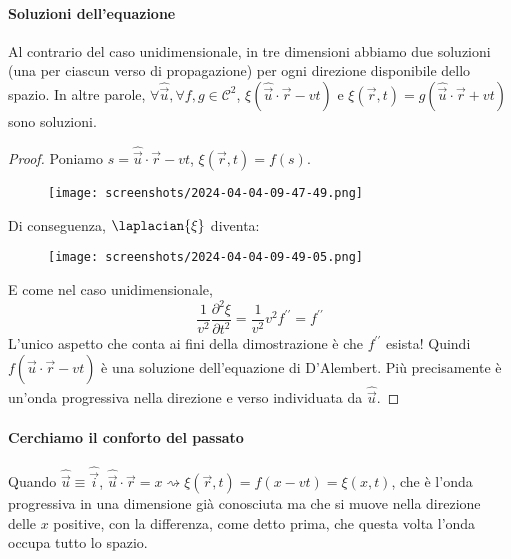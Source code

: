 \paragraph{Soluzioni dell'equazione}
Al contrario del caso unidimensionale, in tre dimensioni abbiamo due soluzioni (una per ciascun verso di propagazione) per ogni direzione disponibile dello spazio. In altre parole, \(\forall \hat{\vec{u}}, \forall f,g \in \mathcal{C} ^{2}  \), \(\xi (\hat{\vec{u}} \cdot \vec{r} - vt )\) e \(\xi (\vec{r} , t)= g(\hat{\vec{u}} \cdot \vec{r} + vt)\) sono soluzioni.
\begin{proof}
	Poniamo \(s=\hat{\vec{u}} \cdot \vec{r} - vt \), \(\xi (\vec{r}, t)=f(s)\).
	\begin{figure}[H]
		\centering
		\texttt{[image: screenshots/2024-04-04-09-47-49.png]}
	\end{figure}
	Di conseguenza, \(\laplacian{\xi } \) diventa:
	\begin{figure}[H]
		\centering
		\texttt{[image: screenshots/2024-04-04-09-49-05.png]}
	\end{figure}
	E come nel caso unidimensionale,
	\[
		\frac{1}{v^{2} }\frac{\partial ^{2} \xi }{\partial t^{2} } = \frac{1}{v^{2} } v^{2} f^{\prime\prime} = f^{\prime\prime} 
	\]
	L'unico aspetto che conta ai fini della dimostrazione è che \(f^{\prime\prime} \) esista! Quindi \(f(\hat{\vec{u}} \cdot \vec{r} - vt)\) è una soluzione dell'equazione di D'Alembert. Più precisamente è un'onda progressiva nella direzione e verso individuata da \(\hat{\vec{u}}\).
\end{proof}

\paragraph{Cerchiamo il conforto del passato}
Quando \(\hat{\vec{u}} \equiv \hat{\vec{i}} \), \(\hat{\vec{u}} \cdot \vec{r} = x \rightsquigarrow \xi (\vec{r},t ) = f(x-vt) = \xi (x,t)\), che è l'onda progressiva in una dimensione già conosciuta ma che si muove nella direzione delle \(x\) positive, con la differenza, come detto prima, che questa volta l'onda occupa tutto lo spazio.

